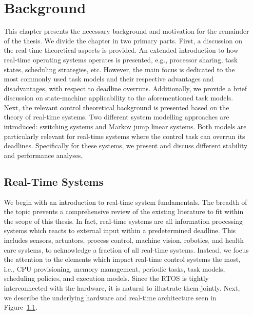 \chapter{Background}%
\label{ch:background}%

This chapter presents the necessary background and motivation for the remainder of the thesis.
We divide the chapter in two primary parts.
First, a discussion on the real-time theoretical aspects is provided.
An extended introduction to how real-time operating systems operates is presented, e.g., processor sharing, task states, scheduling strategies, etc.
However, the main focus is dedicated to the most commonly used task models and their respective advantages and disadvantages, with respect to deadline overruns.
Additionally, we provide a brief discussion on state-machine applicability to the aforementioned task models. 
Next, the relevant control theoretical background is presented based on the theory of real-time systems.
Two different system modelling approaches are introduced: switching systems and Markov jump linear systems.
Both models are particularly relevant for real-time systems where the control task can overrun its deadlines.
Specifically for these systems, we present and discuss different stability and performance analyses.

\section{Real-Time Systems}%
\label{sec:background:rts}%
%
We begin with an introduction to real-time system fundamentals. 
The breadth of the topic prevents a comprehensive review of the existing literature to fit within the scope of this thesis.
In fact, real-time systems are all information processing systems which reacts to external input within a predetermined deadline. 
This includes sensors, actuators, process control, machine vision, robotics, and health care systems, to acknowledge a fraction of all real-time systems.
Instead, we focus the attention to the elements which impact real-time control systems the most, i.e., CPU provisioning, memory management, periodic tasks, task models, scheduling policies, and execution models.
Since the RTOS is tightly interconnected with the hardware, it is natural to illustrate them jointly.
Next, we describe the underlying hardware and real-time architecture seen in Figure~\ref{fig:operating-system-abstraction}.
%
\begin{figure}[t]
    \centering
    \caption{}%
    \label{fig:operating-system-abstraction}%
\end{figure}

